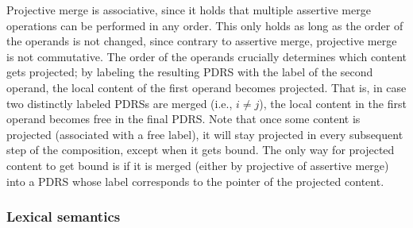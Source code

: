 \noindent Projective merge is associative, since it holds that multiple
assertive merge operations can be performed in any order. This only holds as
long as the order of the operands is not changed, since contrary to
assertive merge, projective merge is not commutative. The order of the
operands crucially determines which content gets projected; by labeling the
resulting PDRS with the label of the second operand, the local content of
the first operand becomes projected.  That is, in case two distinctly
labeled PDRSs are merged (i.e., $i\neq j$), the local content in the first
operand becomes free in the final PDRS.  Note that once some content is
projected (associated with a free label), it will stay projected in every
subsequent step of the composition, except when it gets bound. The only way
for projected content to get bound is if it is merged (either by projective
of assertive merge) into a PDRS whose label corresponds to the pointer of
the projected content. 

%

\subsubsection{Lexical semantics}




